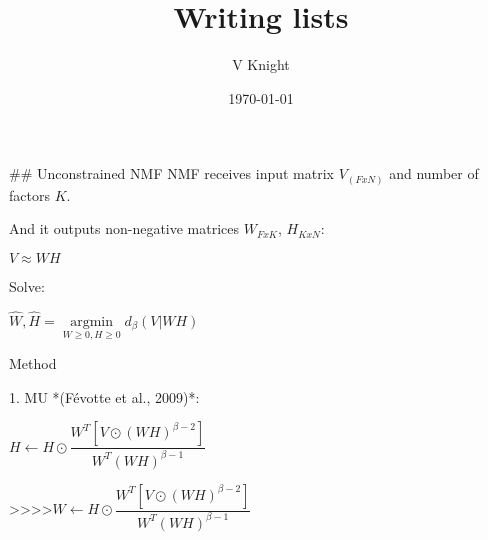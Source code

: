 \documentclass{article}
\title{Writing lists}
\author{V Knight}
\date{\today}
\begin{document}
## Unconstrained NMF
NMF receives input matrix $V_{(FxN)}$ and number of factors $K$.

And it outputs non-negative matrices $W_{FxK}$, $H_{KxN}$: 

$V \approx WH$

Solve:

$\hat{W},\hat{H} = \underset{W\geq0,H\geq0}{\operatorname{argmin}} d_{\beta}(V|WH)$ 


Method

 1.  MU *(Févotte et al., 2009)*:



$H \gets H \odot \dfrac{W^T[V \odot(WH)^{\beta-2}]}{W^T(WH)^{\beta-1}}$

>>>>$W \gets H \odot \dfrac{W^T[V \odot(WH)^{\beta-2}]}{W^T(WH)^{\beta-1}}$
\end{document}

